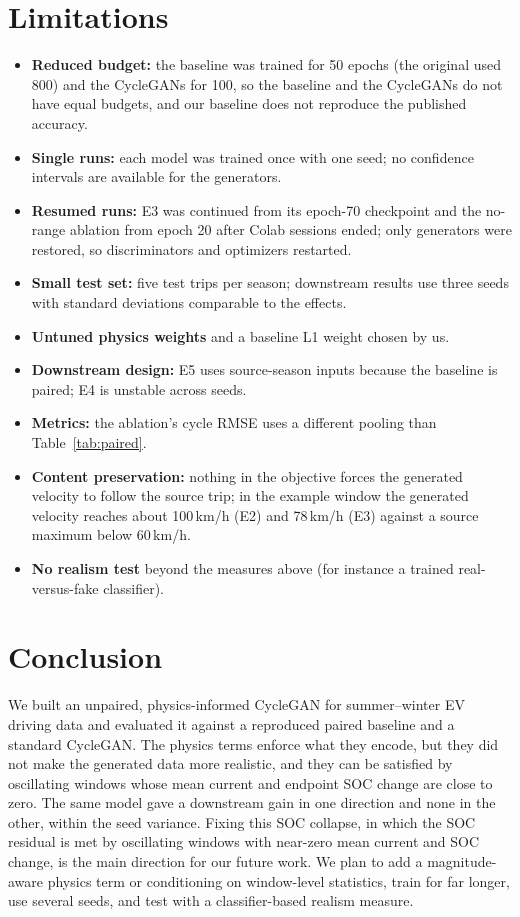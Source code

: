 \documentclass[conference]{IEEEtran}
\begin{document}
\section{Limitations}
\label{sec:limits}
\begin{itemize}
\item \textbf{Reduced budget:} the baseline was trained for 50 epochs (the original used 800) and the CycleGANs for 100, so the baseline and the CycleGANs do not have equal budgets, and our baseline does not reproduce the published accuracy.
\item \textbf{Single runs:} each model was trained once with one seed; no confidence intervals are available for the generators.
\item \textbf{Resumed runs:} E3 was continued from its epoch-70 checkpoint and the no-range ablation from epoch 20 after Colab sessions ended; only generators were restored, so discriminators and optimizers restarted.
\item \textbf{Small test set:} five test trips per season; downstream results use three seeds with standard deviations comparable to the effects.
\item \textbf{Untuned physics weights} and a baseline L1 weight chosen by us.
\item \textbf{Downstream design:} E5 uses source-season inputs because the baseline is paired; E4 is unstable across seeds.
\item \textbf{Metrics:} the ablation's cycle RMSE uses a different pooling than Table~\ref{tab:paired}.
\item \textbf{Content preservation:} nothing in the objective forces the generated velocity to follow the source trip; in the example window the generated velocity reaches about 100\,km/h (E2) and 78\,km/h (E3) against a source maximum below 60\,km/h.
\item \textbf{No realism test} beyond the measures above (for instance a trained real-versus-fake classifier).
\end{itemize}

\section{Conclusion}
We built an unpaired, physics-informed CycleGAN for summer--winter EV driving data and evaluated it against a reproduced paired baseline and a standard CycleGAN. The physics terms enforce what they encode, but they did not make the generated data more realistic, and they can be satisfied by oscillating windows whose mean current and endpoint SOC change are close to zero. The same model gave a downstream gain in one direction and none in the other, within the seed variance. Fixing this SOC collapse, in which the SOC residual is met by oscillating windows with near-zero mean current and SOC change, is the main direction for our future work. We plan to add a magnitude-aware physics term or conditioning on window-level statistics, train for far longer, use several seeds, and test with a classifier-based realism measure.
\end{document}
